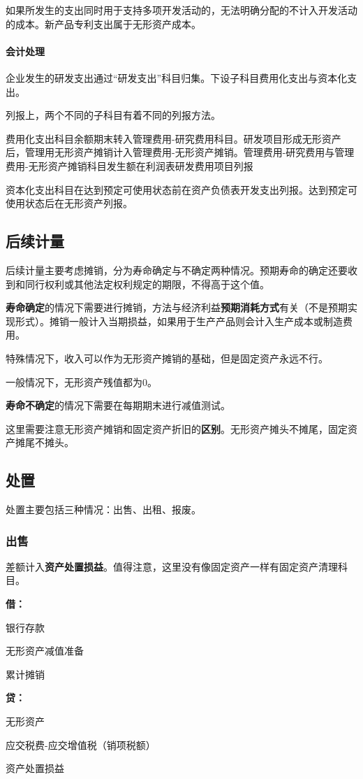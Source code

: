 \documentclass[UTF8,12pt]{ctexart}
\newenvironment{Dr}{%
	\begin{list}{}%
		{
			\setlength{\leftmargin}{2em}
			\setlength{\labelwidth}{2em}
			\setlength{\labelsep}{0pt}
			\setlength{\itemindent}{0pt}
			\setlength{\listparindent}{0pt}
			\setlength{\parsep}{0pt}
			\setlength{\topsep}{0pt}
		}
		\item[\textbf{借：}]
	}{%
	\end{list}
}
\newenvironment{Cr}{%
	\begin{list}{}%
		{
			\setlength{\leftmargin}{2em}
			\setlength{\labelwidth}{2em}
			\setlength{\labelsep}{0pt}
			\setlength{\itemindent}{0pt}
			\setlength{\listparindent}{0pt}
			\setlength{\parsep}{0pt}
			\setlength{\topsep}{0pt}
		}
		\item[\textbf{贷：}]
	}{%
	\end{list}
}
\numberwithin{equation}{section} %
\numberwithin{figure}{section}
\numberwithin{table}{section}
\begin{document}
	如果所发生的支出同时用于支持多项开发活动的，无法明确分配的不计入开发活动的成本。新产品专利支出属于无形资产成本。
	
	\paragraph{会计处理}
	企业发生的研发支出通过“研发支出”科目归集。下设子科目费用化支出与资本化支出。
	
	列报上，两个不同的子科目有着不同的列报方法。
	
	费用化支出科目余额期末转入管理费用-研究费用科目。研发项目形成无形资产后，管理用无形资产摊销计入管理费用-无形资产摊销。管理费用-研究费用与管理费用-无形资产摊销科目发生额在利润表研发费用项目列报
	
	资本化支出科目在达到预定可使用状态前在资产负债表开发支出列报。达到预定可使用状态后在无形资产列报。
	
	
	
	\subsection{后续计量}
	后续计量主要考虑摊销，分为寿命确定与不确定两种情况。预期寿命的确定还要收到和同行权利或其他法定权利规定的期限，不得高于这个值。
	
	\textbf{寿命确定}的情况下需要进行摊销，方法与经济利益\textbf{预期消耗方式}有关（不是预期实现形式）。摊销一般计入当期损益，如果用于生产产品则会计入生产成本或制造费用。
	
	特殊情况下，收入可以作为无形资产摊销的基础，但是固定资产永远不行。
	
	一般情况下，无形资产残值都为0。
	
	\textbf{寿命不确定}的情况下需要在每期期末进行减值测试。
	
	这里需要注意无形资产摊销和固定资产折旧的\textbf{区别}。无形资产摊头不摊尾，固定资产摊尾不摊头。
	
	\subsection{处置}
	
	处置主要包括三种情况：出售、出租、报废。
	
	\subsubsection{出售}
	差额计入\textbf{资产处置损益}。值得注意，这里没有像固定资产一样有固定资产清理科目。
	
	\begin{Dr}
		银行存款
		
		无形资产减值准备
		
		累计摊销
	\end{Dr}
	\begin{Cr}
		无形资产
		
		应交税费-应交增值税（销项税额）
		
		资产处置损益
	\end{Cr}
	
\end{document}

